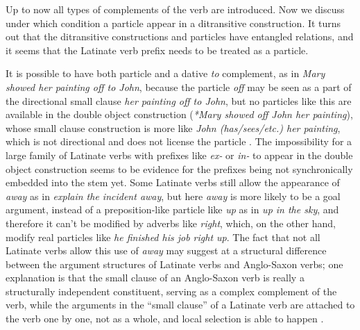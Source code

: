 \documentclass[UTF8, a4paper, oneside, scheme=plain, 12pt]{ctexbook}
\newcommand{\form}[1]{\emph{#1}}
\begin{document}
Up to now all types of complements of the verb are introduced.
Now we discuss under which condition a particle appear in a ditransitive construction. 
It turns out that
the ditransitive constructions and particles have entangled relations, 
and it seems that the Latinate verb prefix needs to be treated as a particle.

It is possible to have both particle and a dative \form{to} complement, 
as in \form{Mary showed her painting off to John}, 
because the particle \form{off} may be seen as a part 
of the directional small clause \form{her painting off to John}, 
but no particles like this are available in the double object construction
(\form{*Mary showed off John her painting}),
whose small clause construction is more like \form{John (has/sees/etc.) her painting},
which is not directional and does not license the particle \citep{harley2007bipartite}.
The impossibility for a large family of Latinate verbs 
with prefixes like \form{ex-} or \form{in-}
to appear in the double object construction 
seems to be evidence for the prefixes being not synchronically embedded into the stem yet.
Some Latinate verbs still allow the appearance of \form{away} 
as in \form{explain the incident away}, 
but here \form{away} is more likely to be a goal argument, 
instead of a preposition-like particle like \form{up} as in \form{up in the sky}, 
and therefore it can't be modified by adverbs like \form{right},
which, on the other hand, modify real particles like \form{he finished his job right up}.
The fact that not all Latinate verbs allow this use of \form{away} 
may suggest at a structural difference between the argument structures 
of Latinate verbs and Anglo-Saxon verbs;
one explanation is that the small clause of an Anglo-Saxon verb 
is really a structurally independent constituent, 
serving as a complex complement of the verb, 
while the arguments in the ``small clause'' of a Latinate verb 
are attached to the verb one by one, not as a whole, 
and local selection is able to happen \citep{punske2013three}.
\end{document}
